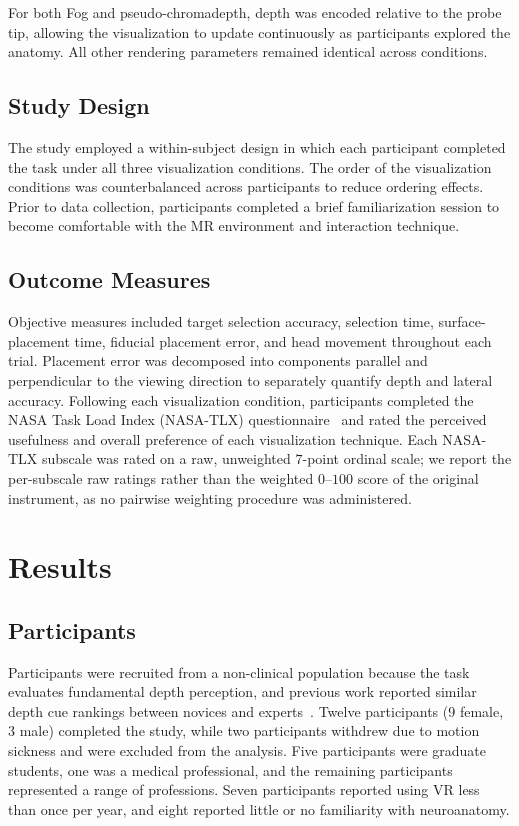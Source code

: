 \documentclass[runningheads]{llncs}
\begin{document}
For both Fog and pseudo-chromadepth, depth was encoded relative to the probe tip, allowing the visualization to update continuously as participants explored the anatomy. All other rendering parameters remained identical across conditions.

\subsection{Study Design}
The study employed a within-subject design in which each participant completed the task under all three visualization conditions. The order of the visualization conditions was counterbalanced across participants to reduce ordering effects. Prior to data collection, participants completed a brief familiarization session to become comfortable with the MR environment and interaction technique.

\subsection{Outcome Measures}

Objective measures included target selection accuracy, selection time, surface-placement time, fiducial placement error, and head movement throughout each trial. Placement error was decomposed into components parallel and perpendicular to the viewing direction to separately quantify depth and lateral accuracy. Following each visualization condition, participants completed the NASA Task Load Index (NASA-TLX) questionnaire~\cite{hart_development_1988} and rated the perceived usefulness and overall preference of each visualization technique. Each NASA-TLX subscale was rated on a raw, unweighted $7$-point ordinal scale; we report the per-subscale raw ratings rather than the weighted $0$--$100$ score of the original instrument, as no pairwise weighting procedure was administered.

\section{Results}

\subsection{Participants}

Participants were recruited from a non-clinical population because the task evaluates fundamental depth perception, and previous work reported similar depth cue rankings between novices and experts~\cite{kersten-oertel_evaluation_2014}. Twelve participants (9 female, 3 male) completed the study, while two participants withdrew due to motion sickness and were excluded from the analysis. Five participants were graduate students, one was a medical professional, and the remaining participants represented a range of professions. Seven participants reported using VR less than once per year, and eight reported little or no familiarity with neuroanatomy.
\end{document}
